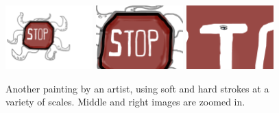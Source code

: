 \documentclass[review]{acmsiggraph}
\begin{document}
\begin{figure}
    \centering
        \includegraphics[width=0.3\textwidth]{images/stop12}
        \includegraphics[width=0.3\textwidth]{images/stop22}
        \includegraphics[width=0.3\textwidth]{images/stop32}
    \caption{Another painting by an artist, using soft and hard strokes at a variety of scales.  Middle and right images are zoomed in.}
    \label{fig:stop}
\end{figure}
\end{document}

